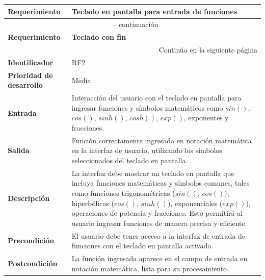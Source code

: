 \begin{longtable}{|m{3.5cm}|m{9.5cm}|}
	\hline
	\rowcolor{black!75} \color{white}\textbf{Requerimiento} & \color{white}\textbf{Teclado en pantalla para entrada de funciones} \\
	\hline
	\endfirsthead
	\multicolumn{2}{c}{{\tablename\ \thetable{} -- continuación}} \\
	\hline
	\rowcolor{black!75} \color{white}\textbf{Requerimiento} & \color{white}\textbf{Teclado con fin} \\
	\hline
	\endhead
	\hline \multicolumn{2}{r}{{Continúa en la siguiente página}} \\
	\endfoot
	\hline
	\endlastfoot
	
	\textbf{Identificador} & RF2 \\
	\hline
	\textbf{Prioridad de desarrollo} & Media \\
	\hline
	\textbf{Entrada} & Interacción del usuario con el teclado en pantalla para ingresar funciones y símbolos matemáticos como $sin()$, $cos()$, $sinh()$, $cosh()$, $exp()$, exponentes y fracciones. \\
	\hline
	\textbf{Salida} & Función correctamente ingresada en notación matemática en la interfaz de usuario, utilizando los símbolos seleccionados del teclado en pantalla. \\
	\hline
	\textbf{Descripción} & La interfaz debe mostrar un teclado en pantalla que incluya funciones matemáticas y símbolos comunes, tales como funciones trigonométricas ($sin()$, $cos()$), hiperbólicas ($cos()$, $sinh()$), exponenciales ($exp()$), operaciones de potencia y fracciones. Esto permitirá al usuario ingresar funciones de manera precisa y eficiente. \\
	\hline
	\textbf{Precondición} & El usuario debe tener acceso a la interfaz de entrada de funciones con el teclado en pantalla activado. \\
	\hline
	\textbf{Postcondición} & La función ingresada aparece en el campo de entrada en notación matemática, lista para su procesamiento. \\
	\hline
\end{longtable}
 \label{tabla:RF2}
\vspace{0.5cm}

